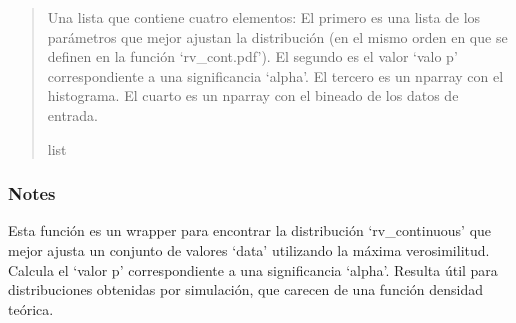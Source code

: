 \documentclass[letterpaper,10pt,english]{sphinxmanual}
\begin{document}
\begin{fulllineitems}
\begin{quote}
\begin{description}
\begin{itemize}
\end{itemize}

\sphinxAtStartPar
Una lista que contiene cuatro elementos:
\sphinxhyphen{} El primero es una lista de los parámetros que mejor ajustan la distribución (en el mismo orden en que se definen en la función ‘rv\_cont.pdf’).
\sphinxhyphen{} El segundo es el valor ‘valo p’ correspondiente a una significancia ‘alpha’.
\sphinxhyphen{} El tercero es un nparray con el histograma.
\sphinxhyphen{} El cuarto es un nparray con el bineado de los datos de entrada.

\sphinxAtStartPar
list

\end{description}\end{quote}
\subsubsection*{Notes}

\sphinxAtStartPar
Esta función es un wrapper para encontrar la distribución ‘rv\_continuous’ que mejor ajusta un conjunto de valores ‘data’ utilizando la máxima verosimilitud.
Calcula el ‘valor p’ correspondiente a una significancia ‘alpha’. Resulta útil para distribuciones obtenidas por simulación, que carecen de una función
densidad teórica.

\end{fulllineitems}

\end{document}
